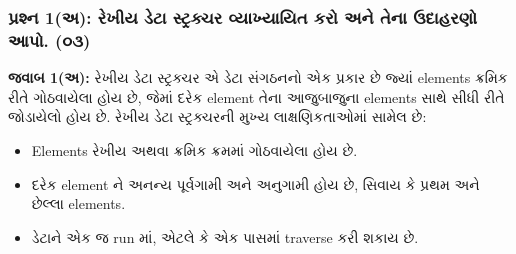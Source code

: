 \begin{Shaded}
\begin{Highlighting}[]



\end{Highlighting}
\end{Shaded}

\hypertarget{uxaaauxab0uxab6uxaa8-1uxa85-uxab0uxa96uxaaf-uxaa1uxa9f-uxab8uxa9fuxab0uxa95uxa9auxab0-uxab5uxaafuxa96uxaafuxaafuxaa4-uxa95uxab0-uxa85uxaa8-uxaa4uxaa8-uxa89uxaa6uxab9uxab0uxaa3-uxa86uxaaa.-uxae6uxae9}{%
\subsubsection{પ્રશ્ન 1(અ): રેખીય ડેટા સ્ટ્રક્ચર વ્યાખ્યાયિત કરો અને તેના ઉદાહરણો
આપો.
(૦૩)}\label{uxaaauxab0uxab6uxaa8-1uxa85-uxab0uxa96uxaaf-uxaa1uxa9f-uxab8uxa9fuxab0uxa95uxa9auxab0-uxab5uxaafuxa96uxaafuxaafuxaa4-uxa95uxab0-uxa85uxaa8-uxaa4uxaa8-uxa89uxaa6uxab9uxab0uxaa3-uxa86uxaaa.-uxae6uxae9}}

\textbf{જવાબ 1(અ):} રેખીય ડેટા સ્ટ્રક્ચર એ ડેટા સંગઠનનો એક પ્રકાર છે જ્યાં elements
ક્રમિક રીતે ગોઠવાયેલા હોય છે, જેમાં દરેક element તેના આજુબાજુના elements સાથે સીધી
રીતે જોડાયેલો હોય છે. રેખીય ડેટા સ્ટ્રક્ચરની મુખ્ય લાક્ષણિકતાઓમાં સામેલ છે:

\begin{itemize}
\tightlist
\item
  Elements રેખીય અથવા ક્રમિક ક્રમમાં ગોઠવાયેલા હોય છે.
\item
  દરેક element ને અનન્ય પૂર્વગામી અને અનુગામી હોય છે, સિવાય કે પ્રથમ અને છેલ્લા
  elements.
\item
  ડેટાને એક જ run માં, એટલે કે એક પાસમાં traverse કરી શકાય છે.
\end{itemize}

